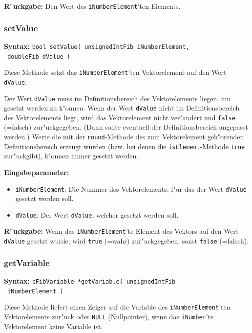 \bigskip\noindent
\textbf{R"uckgabe:} Den Wert des \verb|iNumberElement|'ten Elements.


\subsubsection{setValue}

\textbf{Syntax:} \verb|bool setValue( unsignedIntFib iNumberElement,| \\\verb| doubleFib dValue )|

\bigskip\noindent
Diese Methode setzt das \verb|iNumberElement|'ten Vektorelement auf den Wert \verb|dValue|.

Der Wert \verb|dValue| muss im Definitionsbereich des Vektorelements liegen, um gesetzt werden zu k"onnen. Wenn der Wert \verb|dValue| nicht im Definitionsbereich des Vektorelements liegt, wird das Vektorelement nicht ver"andert und \verb|false| (=falsch) zur"uckgegeben. (Dann sollte eventuell der Definitionsbereich angepasst werden.) Werte die mit der \verb|round|-Methode des zum Vektorelement geh"orenden Definitionsbereich erzeugt wurden (bzw. bei denen die \verb|isElement|-Methode \verb|true| zur"uckgibt), k"onnen immer gesetzt werden.

\bigskip\noindent
\textbf{Eingabeparameter:}
\begin{itemize}
 \item \verb|iNumberElement|: Die Nummer des Vektorelements, f"ur das der Wert \verb|dValue| gesetzt werden soll.
 \item \verb|dValue|: Der Wert \verb|dValue|, welcher gesetzt werden soll.
\end{itemize}

\bigskip\noindent
\textbf{R"uckgabe:} Wenn das \verb|iNumberElement|'te Element des Vektors auf den Wert \verb|dValue| gesetzt wurde, wird \verb|true| (=wahr) zur"uckgegeben, sonst \verb|false| (=falsch).


\subsubsection{getVariable}

\textbf{Syntax:} \verb|cFibVariable *getVariable( unsignedIntFib| \\\verb| iNumberElement )|

\bigskip\noindent
Diese Methode liefert einen Zeiger auf die Variable des \verb|iNumberElement|'ten Vektorelements zur"uck oder \verb|NULL| (Nullpointer), wenn das \verb|iNumber|'te Vektorelement keine Variable ist.

